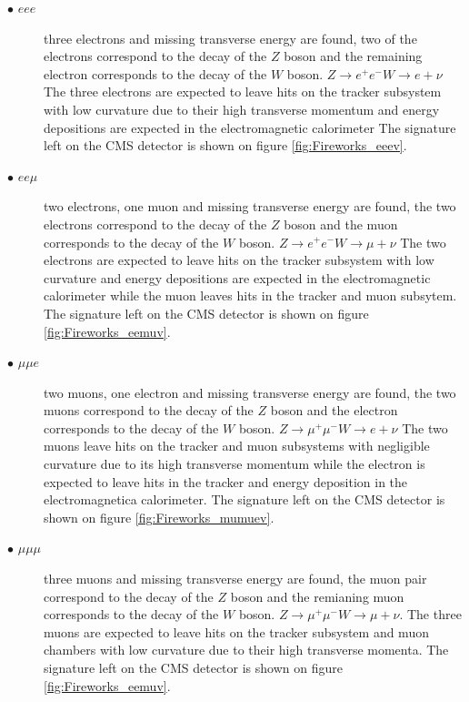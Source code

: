 \begin{description}
\item[$\bullet$ $eee$] three electrons and missing transverse energy are found, two of the
  electrons correspond to the decay of the $Z$ boson and the remaining electron corresponds
  to the decay of the $W$ boson. $Z\rightarrow e^{+}e^{-} W\rightarrow e+\nu$
  The three electrons are expected to leave hits on the
  tracker subsystem with low curvature due to their high transverse momentum and
  energy depositions are expected in the electromagnetic calorimeter
  The signature left on the CMS detector is shown on figure \ref{fig:Fireworks_eeev}.
\item[$\bullet$ $ee\mu$] two electrons, one muon and missing transverse energy are found,
  the two electrons correspond to the decay of the $Z$ boson and the muon corresponds to the
  decay of the $W$ boson. $Z\rightarrow e^{+}e^{-} W\rightarrow \mu+\nu$ The two electrons are
  expected to leave hits on the tracker subsystem with low curvature and energy
  depositions are expected in the electromagnetic calorimeter while the muon leaves
  hits in the tracker and muon subsytem. The signature left on the CMS
  detector is shown on figure \ref{fig:Fireworks_eemuv}.
\item[$\bullet$ $\mu\mu e$] two muons, one electron and missing transverse energy are found,
  the two muons correspond to the decay of the $Z$ boson and the electron corresponds to the
  decay of the $W$ boson. $Z\rightarrow \mu^{+}\mu^{-} W\rightarrow e+\nu$ The two
  muons leave hits on the tracker and muon subsystems with negligible curvature due
  to its high transverse momentum while the electron is expected to leave hits in
  the tracker and energy deposition in the electromagnetica calorimeter.
  The signature left on the CMS detector is shown on figure \ref{fig:Fireworks_mumuev}.
\item[$\bullet$ $\mu\mu\mu$] three muons and missing transverse energy are found, the muon pair
  correspond to the decay of the $Z$ boson and the remianing muon corresponds
  to the decay of the $W$ boson. $Z\rightarrow \mu^{+}\mu^{-} W\rightarrow \mu+\nu$.
  The three muons are expected to leave hits on the tracker subsystem and muon chambers
  with low curvature due to their high transverse momenta. The signature
  left on the CMS detector is shown on figure \ref{fig:Fireworks_eemuv}.
\end{description}


